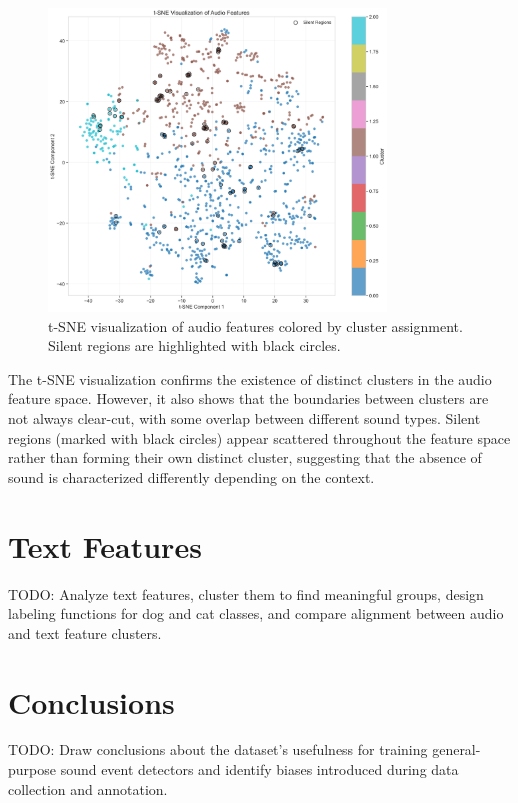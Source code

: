 \documentclass{article}
\begin{document}
\begin{figure}[H]
  \centering
  \includegraphics[width=0.8\textwidth]{figures/audio_features/tsne_visualization.png}
  \caption{t-SNE visualization of audio features colored by cluster assignment. Silent regions are highlighted with black circles.}
  \label{fig:tsne}
\end{figure}

The t-SNE visualization confirms the existence of distinct clusters in the audio feature space. However, it also shows that the boundaries between clusters are not always clear-cut, with some overlap between different sound types. Silent regions (marked with black circles) appear scattered throughout the feature space rather than forming their own distinct cluster, suggesting that the absence of sound is characterized differently depending on the context.

\section{Text Features}
\label{sec:text_features}

TODO: Analyze text features, cluster them to find meaningful groups, design labeling functions for dog and cat classes, and compare alignment between audio and text feature clusters.

\section{Conclusions}
\label{sec:conclusions}

TODO: Draw conclusions about the dataset's usefulness for training general-purpose sound event detectors and identify biases introduced during data collection and annotation.
\end{document}
